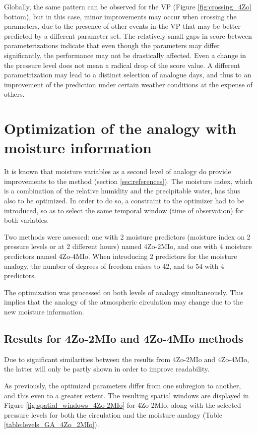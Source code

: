 \documentclass[review]{elsarticle}
\begin{document}
Globally, the same pattern can be observed for the VP (Figure \ref{fig:crossing_4Zo} bottom), but in this case, minor improvements may occur when crossing the parameters, due to the presence of other events in the VP that may be better predicted by a different parameter set. The relatively small gaps in score between parameterizations indicate that even though the parameters may differ significantly, the performance may not be drastically affected. Even a change in the pressure level does not mean a radical drop of the score value. A different parametrization may lead to a distinct selection of analogue days, and thus to an improvement of the prediction under certain weather conditions at the expense of others.


\section{Optimization of the analogy with moisture information}
\label{sec:optim_moisture}

It is known that moisture variables as a second level of analogy do provide improvements to the method (section \ref{sec:references}). The moisture index, which is a combination of the relative humidity and the precipitable water, has thus also to be optimized. In order to do so, a constraint to the optimizer had to be introduced, so as to select the same temporal window (time of observation) for both variables. 

Two methods were assessed: one with 2 moisture predictors (moisture index on 2 pressure levels or at 2 different hours) named 4Zo-2MIo, and one with 4 moisture predictors named 4Zo-4MIo. When introducing 2 predictors for the moisture analogy, the number of degrees of freedom raises to 42, and to 54 with 4 predictors.

The optimization was processed on both levels of analogy simultaneously. This implies that the analogy of the atmospheric circulation may change due to the new moisture information.


\subsection{Results for 4Zo-2MIo and 4Zo-4MIo methods}

Due to significant similarities between the results from 4Zo-2MIo and 4Zo-4MIo, the latter will only be partly shown in order to improve readability.

As previously, the optimized parameters differ from one subregion to another, and this even to a greater extent. The resulting spatial windows are displayed in Figure \ref{fig:spatial_windows_4Zo-2MIo} for 4Zo-2MIo, along with the selected pressure levels for both the circulation and the moisture analogy (Table \ref{table:levels_GA_4Zo_2MIo}). 
\end{document}
